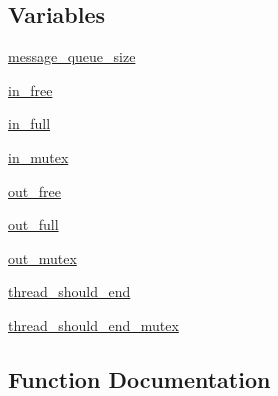 \subsection*{Variables}
\begin{DoxyCompactItemize}
\item 
\hyperlink{namespaceNEAT__PyGenetics_1_1NEAT_1_1Networking_1_1Server_1_1NEATServer_a06c3658b631544a2d391856bc4157fb7}{message\+\_\+queue\+\_\+size}
\item 
\hyperlink{namespaceNEAT__PyGenetics_1_1NEAT_1_1Networking_1_1Server_1_1NEATServer_af588da43cb6226eeefed66fcd0b55f3f}{in\+\_\+free}
\item 
\hyperlink{namespaceNEAT__PyGenetics_1_1NEAT_1_1Networking_1_1Server_1_1NEATServer_a103058cec8663aa23ad8b490a60d9636}{in\+\_\+full}
\item 
\hyperlink{namespaceNEAT__PyGenetics_1_1NEAT_1_1Networking_1_1Server_1_1NEATServer_a5ad5f8cb9ef69061f884d1e90917ab3c}{in\+\_\+mutex}
\item 
\hyperlink{namespaceNEAT__PyGenetics_1_1NEAT_1_1Networking_1_1Server_1_1NEATServer_a036def46999e8405d81e4a1fe107ebbb}{out\+\_\+free}
\item 
\hyperlink{namespaceNEAT__PyGenetics_1_1NEAT_1_1Networking_1_1Server_1_1NEATServer_aa41e6cd5b937e1297e70b15d7a27f815}{out\+\_\+full}
\item 
\hyperlink{namespaceNEAT__PyGenetics_1_1NEAT_1_1Networking_1_1Server_1_1NEATServer_a2707de3d151443b717044f44638fb0ca}{out\+\_\+mutex}
\item 
\hyperlink{namespaceNEAT__PyGenetics_1_1NEAT_1_1Networking_1_1Server_1_1NEATServer_abec4285c7ad0edab7a9fd7ebe9dc68b7}{thread\+\_\+should\+\_\+end}
\item 
\hyperlink{namespaceNEAT__PyGenetics_1_1NEAT_1_1Networking_1_1Server_1_1NEATServer_a0b02bca7bd26405ce43a713830d97217}{thread\+\_\+should\+\_\+end\+\_\+mutex}
\end{DoxyCompactItemize}


\subsection{Function Documentation}
